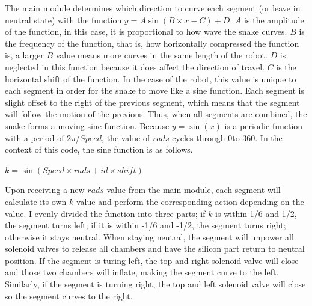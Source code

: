 \documentclass[twoside, 11pt]{article}
\begin{document}
The main module determines which direction to curve each segment (or leave in neutral state) with the function \(y=A\sin(B\times x - C) + D\). \(A\) is the amplitude of the function, in this case, it is proportional to how wave the snake curves. \(B\) is the frequency of the function, that is, how horizontally compressed the function is, a larger \(B\) value means more curves in the same length of the robot. \(D\) is neglected in this function because it does affect the direction of travel. \(C\) is the horizontal shift of the function. In the case of the robot, this value is unique to each segment in order for the snake to move like a sine function. Each segment is slight offset to the right of the previous segment, which means that the segment will follow the motion of the previous. Thus, when all segments are combined, the snake forms a moving sine function. Because \(y=\sin(x)\) is a periodic function with a period of 2\(\pi\)/\(Speed\), the value of \(rads\) cycles through 0\degree to 360\degree . In the context of this code, the sine function is as follows. 
\centerline{\(k = \sin(Speed \times rads + id \times shift)\)}
Upon receiving a new \(rads\) value from the main module, each segment will calculate its own \(k\) value and perform the corresponding action depending on the value. I evenly divided the function into three parts; if \(k\) is within 1/6 and 1/2, the segment turns left; if it is within -1/6 and -1/2, the segment turns right; otherwise it stays neutral. When staying neutral, the segment will unpower all solenoid valves to release all chambers and have the silicon part return to neutral position. If the segment is turing left, the top and right solenoid valve will close and those two chambers will inflate, making the segment curve to the left. Similarly, if the segment is turning right, the top and left solenoid valve will close so the segment curves to the right. 
\end{document}
